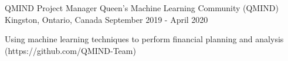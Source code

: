 

\begin{cventries}

  \cventry
    {QMIND Project Manager} %
    {Queen's Machine Learning Community (QMIND)} %
    {Kingston, Ontario, Canada} %
    {September 2019 - April 2020} %
    {
      \begin{cvitems} %
        \item {Using machine learning techniques to perform financial planning and analysis
(https://github.com/QMIND-Team)}
      \end{cvitems}
    }

\end{cventries}
